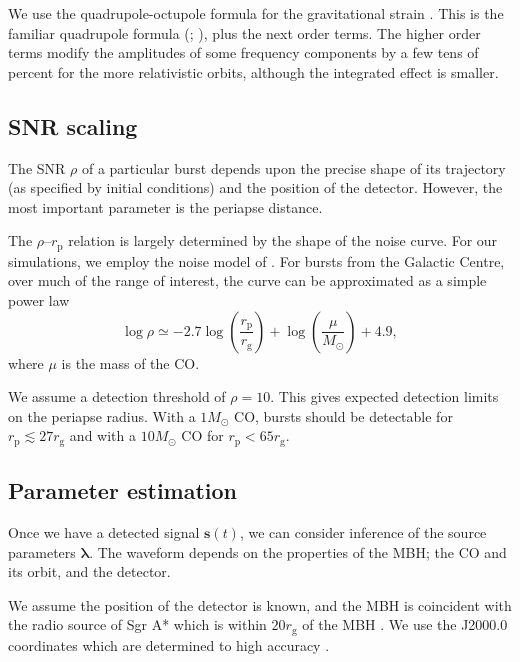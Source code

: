 \documentclass[useAMS,usedcolumn,usegraphicx,usenatbib]{mn2e}
\newcommand{\sub}[1]{\ensuremath{_\mathrm{#1}}}
\begin{document}
We use the quadrupole-octupole formula for the gravitational strain \citep{Bekenstein1973, Press1977, Yunes2008}. This is the familiar quadrupole formula (\citealt*[section 36.10]{Misner1973}; \citealt[section 17.9]{Hobson2006}), plus the next order terms. The higher order terms modify the amplitudes of some frequency components by a few tens of percent for the more relativistic orbits, although the integrated effect is smaller.

\subsection{SNR scaling}\label{sec:SNR}

The SNR $\rho$ of a particular burst depends upon the precise shape of its trajectory (as specified by initial conditions) and the position of the detector. However, the most important parameter is the periapse distance.

The $\rho$--$r\sub{p}$ relation is largely determined by the shape of the noise curve. For our simulations, we employ the noise model of \citet{Barack2004}. For bursts from the Galactic Centre, over much of the range of interest, the curve can be approximated as a simple power law \citep{Berry2013}
\begin{equation}
\log\rho \simeq -2.7\log\left(\frac{r\sub{p}}{r\sub{g}}\right) + \log\left(\frac{\mu}{M_\odot}\right) + 4.9,
\label{eq:SNR-power-law}
\end{equation}
where $\mu$ is the mass of the CO.

We assume a detection threshold of $\rho = 10$. This gives expected detection limits on the periapse radius. With a $1 M_\odot$ CO, bursts should be detectable for $r\sub{p} \lesssim 27 r\sub{g}$ and with a $10 M_\odot$ CO for $r\sub{p} < 65 r\sub{g}$.

\subsection{Parameter estimation}

Once we have a detected signal $\boldsymbol{s}(t)$, we can consider inference of the source parameters $\boldsymbol{\lambda}$. The waveform depends on the properties of the MBH; the CO and its orbit, and the detector.

We assume the position of the detector is known, and the MBH is coincident with the radio source of Sgr A* which is within $20 r_\mathrm{g}$ of the MBH \citep{Reid2003,Doeleman2008}. We use the J2000.0 coordinates which are determined to high accuracy \citep{Reid1999, Yusef-Zadeh1999}.
\end{document}
